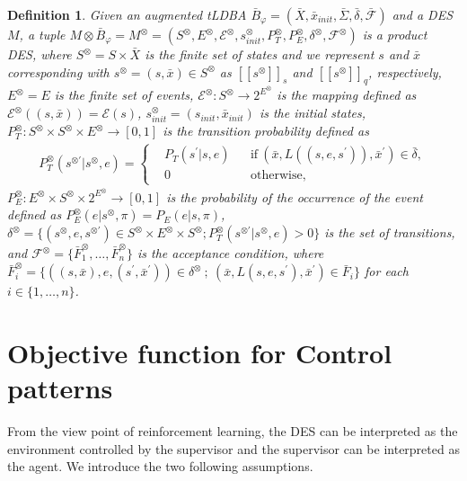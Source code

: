 \documentclass[letterpaper, 10 pt, conference]{ieeeconf}
\newtheorem{definition}{Definition}
\newcommand{\mysps}{\ensuremath{[\![s^{\otimes}]\!]}_s}
\newcommand{\myspq}{\ensuremath{[\![s^{\otimes}]\!]}_q}
\begin{document}
\begin{definition}
  Given an augmented tLDBA $\bar{B}_{\varphi} = (\bar{X}, \bar{x}_{init},\bar{\Sigma},\bar{\delta},\bar{\mathcal{F}})$ and a DES $M$, a tuple $M \otimes \bar{B}_{\varphi} = M^{\otimes} = (S^{\otimes}, E^{\otimes}, {\mathcal E}^{\otimes}, s_{init}^{\otimes}, P^{\otimes}_T, P^{\otimes}_E, \delta^{\otimes}, {\mathcal F}^{\otimes})$ is a product DES, where
  $S^{\otimes} = S \times \bar{X}$ is the finite set of states and we represent $s$ and $\bar{x}$ corresponding with $s^{\otimes} = (s,\bar{x}) \in S^{\otimes}$ as $\mysps$ and $\myspq$, respectively, $E^{\otimes}=E$ is the finite set of events, ${\mathcal E}^{\otimes} : S^{\otimes} \rightarrow 2^{E^{\otimes}}$ is the mapping defined as ${\mathcal E}^{\otimes}((s,\bar{x})) = {\mathcal E}(s)$, $s_{init}^{\otimes} = (s_{init},\bar{x}_{init})$ is the initial states, $P^{\otimes}_T : S^{\otimes} \times S^{\otimes} \times E^{\otimes} \rightarrow [0,1]$ is the transition probability defined as
  \begin{align}
    P^{\otimes}_T(s^{\otimes \prime} | s^{\otimes}, e) =
    \left\{
    \begin{aligned}
      &P_T(s^{\prime} | s, e) &   &\text{if}\  (\bar{x}, L((s,e,s^{\prime})), \bar{x}^{\prime}) \in \bar{\delta},\\
      &0 &   &\text{otherwise} ,
    \end{aligned}
    \right. \nonumber
  \end{align}
  $P^{\otimes}_E : E^{\otimes} \times S^{\otimes} \times 2^{E^{\otimes}} \rightarrow [0,1]$ is the probability of the occurrence of the event defined as $P^{\otimes}_E(e | s^{\otimes}, \pi) = P_E(e | s, \pi)$, $\delta^{\otimes} = \{ (s^{\otimes}, e, s^{\otimes \prime}) \in S^{\otimes} \times E^{\otimes} \times S^{\otimes} ; P^{\otimes}_T(s^{\otimes \prime} | s^{\otimes}, e) > 0 \}$ is the set of transitions, and ${\mathcal F}^{\otimes} = \{ \bar{F}^{\otimes}_1, \ldots ,\bar{F}^{\otimes}_n \}$ is the acceptance condition, where $\bar{F}^{\otimes}_i = \{ ((s,\bar{x}), e, (s^{\prime}, \bar{x}^{\prime})) \in \delta^{\otimes}\ ;\ (\bar{x}, L(s,e,s^{\prime}), \bar{x}^{\prime}) \in \bar{F}_i \}$ for each $ i \in \{ 1, \ldots ,n \}$.
\end{definition}

\section{Objective function for Control patterns}
From the view point of reinforcement learning, the DES can be interpreted as the environment controlled by the supervisor and the supervisor can be interpreted as the agent. We introduce the two following assumptions.
\end{document}
